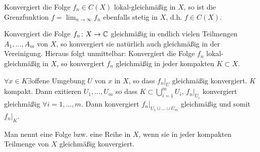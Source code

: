 \begin{satz}[Stetigeitssatz]
	Konvergiert die Folge $ f_n\in C(X) $ lokal-gleichm\"a\ss ig in $ X $, so ist die Grenzfunktion $ f=\lim_{n\to\infty}f_n $ ebenfalls stetig in $ X $, d.h. $ f\in C(X) $.
\end{satz}
\begin{satz}
	Konvergiert die Folge $ f_n\colon X\rightarrow\mathbb{C} $ gleichm\"a\ss ig in endlich vielen Teilmengen $ A_1,...,A_m $ von $ X $, so konvergiert sie nat\"urlich auch gleichm\"a\ss ig in der Vereinigung. Hieraus folgt unmittelbar: Konvergiert die Folge $ f_n $ lokal-gleichm\"a\ss ig in $ X $, so konvergiert $ f_n $ gleichm\"a\ss ig in jeder kompakten $ K\subset X $.
\end{satz}
\begin{beweis}
	$ \forall  x\in K\exists$offene Umgebung $ U $ von $ x $ in $ X $, so dass $ f_n|_U $ gleichm\"a\ss ig konvergiert. $ K $ kompakt. Dann exitieren $ U_1,...,U_m $ so dass $ K\subset\bigcup_{i=1}^m U_i $, $ f_n|_{U_i} $ konvergiert gleichm\"a\ss ig $ \forall i=1,...,m $. Dann konvergiert $ f_n|_{U_1\cup...\cup U_m} $ gleichm\"a\ss ig und somit $ f_n|_K $.
\end{beweis}
\begin{definition}
	Man nennt eine Folge bzw. eine Reihe  in $ X $, wenn sie in jeder kompakten Teilmenge von $ X $ gleichm\"a\ss ig konvergiert.
\end{definition}
